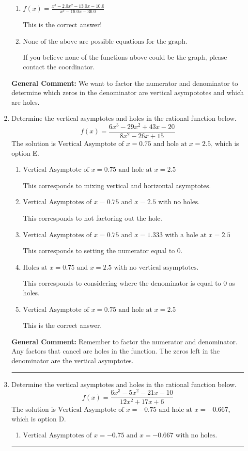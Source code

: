 \documentclass{extbook}[14pt]
\newcommand{\litem}[1]{\item #1

\rule{\textwidth}{0.4pt}}
\begin{document}
\begin{enumerate}
{\begin{enumerate}[label=\Alph*.]
You treated all of the zeros in the denominator as vertical asmptotes when some of them were holes and wrote factors as $x+z$.
\item \( f(x)=\frac{x^{3} -2.0 x^{2} -13.0 x -10.0}{x^{3} -19.0 x -30.0} \)

This is the correct answer!
\item \( \text{None of the above are possible equations for the graph.} \)

If you believe none of the functions above could be the graph, please contact the coordinator.
\end{enumerate}

\textbf{General Comment:} We want to factor the numerator and denominator to determine which zeros in the denominator are vertical asympototes and which are holes.
}
\litem{
Determine the vertical asymptotes and holes in the rational function below.
\[ f(x) = \frac{6x^{3} -29 x^{2} +43 x -20}{8x^{2} -26 x + 15} \]The solution is \( \text{Vertical Asymptote of } x = 0.75 \text{ and hole at } x = 2.5 \), which is option E.\begin{enumerate}[label=\Alph*.]
\item \( \text{Vertical Asymptote of } x = 0.75 \text{ and hole at } x = 2.5 \)

This corresponds to mixing vertical and horizontal asymptotes.
\item \( \text{Vertical Asymptotes of } x = 0.75 \text{ and } x = 2.5 \text{ with no holes.} \)

This corresponds to not factoring out the hole.
\item \( \text{Vertical Asymptotes of } x = 0.75 \text{ and } x = 1.333 \text{ with a hole at } x = 2.5 \)

This corresponds to setting the numerator equal to 0.
\item \( \text{Holes at } x = 0.75 \text{ and } x = 2.5 \text{ with no vertical asymptotes.} \)

This corresponds to considering where the denominator is equal to 0 as holes.
\item \( \text{Vertical Asymptote of } x = 0.75 \text{ and hole at } x = 2.5 \)

This is the correct answer.
\end{enumerate}

\textbf{General Comment:} Remember to factor the numerator and denominator. Any factors that cancel are holes in the function. The zeros left in the denominator are the vertical asymptotes.
}
\litem{
Determine the vertical asymptotes and holes in the rational function below.
\[ f(x) = \frac{6x^{3} -5 x^{2} -21 x -10}{12x^{2} +17 x + 6} \]The solution is \( \text{Vertical Asymptote of } x = -0.75 \text{ and hole at } x = -0.667 \), which is option D.\begin{enumerate}[label=\Alph*.]
\item \( \text{Vertical Asymptotes of } x = -0.75 \text{ and } x = -0.667 \text{ with no holes.} \)


\end{enumerate}}
\end{enumerate}
\end{document}
